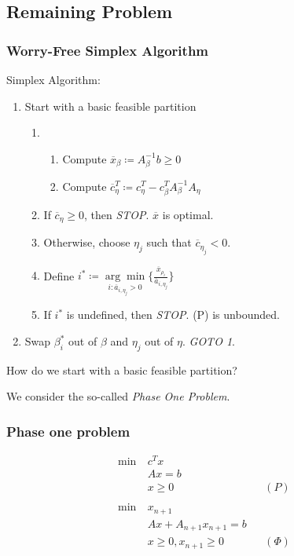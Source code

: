 \subsection{Remaining Problem}
\subsubsection{Worry-Free Simplex Algorithm}
\begin{prev}
	Simplex Algorithm:
	\begin{enumerate}
		\item Start with a basic feasible partition
		      \begin{enumerate}
			      \item \begin{enumerate}
				            \item Compute \(\overline{x}_{\beta} \coloneqq A^{-1}_{\beta} b \geq 0\)
				            \item Compute \(\overline{c}_{\eta}^{T} \coloneqq c_{\eta}^{T} - c_{\beta}^{T} A^{-1}_{\beta} A_{\eta}\)
			            \end{enumerate}
			      \item If \(\overline{c}_{\eta} \geq 0\), then \emph{STOP}. \(\overline{x}\) is optimal.
			      \item Otherwise, choose \(\eta_j\) such that \(\overline{c}_{\eta_j} < 0\).
			      \item Define \(i^{*}\coloneqq \underset{i:\overline{a}_{i, \eta_j}>0}{\arg\min} \{\frac{\overline{x}_{\rho_i}}{\overline{a}_{i, \eta_j}}\} \)
			      \item If \(i^{*}\) is undefined, then \emph{STOP}. (P) is unbounded.
		      \end{enumerate}
		\item Swap \(\beta_i^{*}\) out of \(\beta \) and \(\eta_j\) out of \(\eta \). \emph{GOTO 1}.
	\end{enumerate}
\end{prev}

\begin{problem}
How do we start with a basic feasible partition?
\end{problem}

\begin{answer}
	We consider the so-called \emph{Phase One Problem}.
\end{answer}
\subsubsection{Phase one problem}
\begin{align*}
	\min~ & c^T x                                \\
	      & Ax = b                               \\
	      & x\geq 0                  &  & (P)    \\\\
	\min~ & x_{n+1}                              \\
	      & Ax + A_{n+1}x_{n+1} = b              \\
	      & x\geq 0, x_{n+1} \geq  0 &  & (\Phi)
\end{align*}


